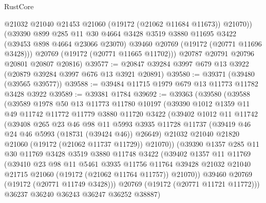 \begin{lexlean}{RustCore}
\begin{coremodule}
            @21032
            @21040
            @21453
            @21060
            (@19172 (@21062 @11684 @11673))
            @21070))
        (@39390
          @899
          @285
          @11
          @30
          @4664
          @3428
          @3519
          @3880
          @11695
          @3422
          (@39453 @898 @4664 @23066 @23070)
          @39460
          @20769
          (@19172 (@20771 @11696 @3428)))
        @20769
        (@19172 (@20771 @11665 @11702)))
      @20787
      @20791
      @20796
      @20801
      @20807
      @20816)
@39577 := @20847 @39284 @3997 @679 @13 @3922 (@20879 @39284 @3997 @676 @13 @3921 @20891)
@39580 := @39371 (@39480 (@39565 @39577))
@39588 := @39484 @11715 @1979 @679 @13 @11773 @11782 @3428 @3922
@39589 := @39381 @1784
@39692 := @39363
    (@39580
      (@39588
        (@39589
          @1978
          @50
          @13
          @11773
          @11780
          @10197
          (@39390
            @1012
            @1359
            @11
            @49
            @11742
            @11772
            @11779
            @3880
            @11720
            @3422
            (@39402
              @1012
              @11
              @11742
              (@39408
                @265
                @23
                @46
                @98
                @11
                @5993
                @3935
                @11728
                @11737
                (@39419 @46 @24 @46 @5993 (@18731 (@39424 @46)) @26649)
                @21032
                @21040
                @21820
                @21060
                (@19172 (@21062 @11737 @11729))
                @21070))
            (@39390
              @1357
              @285
              @11
              @30
              @11769
              @3428
              @3519
              @3880
              @11748
              @3422
              (@39402
                @1357
                @11
                @11769
                (@39410
                  @23
                  @98
                  @11
                  @5461
                  @3935
                  @11756
                  @11764
                  @39428
                  @21032
                  @21040
                  @21715
                  @21060
                  (@19172 (@21062 @11764 @11757))
                  @21070))
              @39460
              @20769
              (@19172 (@20771 @11749 @3428)))
            @20769
            (@19172 (@20771 @11721 @11772)))
          @36237
          @36240
          @36243
          @36247
          @36252
          @38887)

\end{coremodule}
\end{lexlean}
